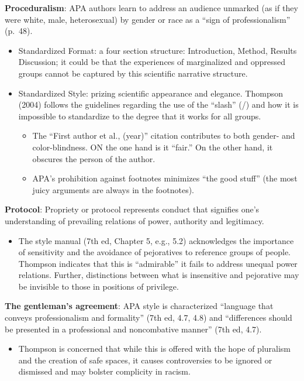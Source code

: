 \documentclass[
  english,
]{book}
\providecommand{\tightlist}{%
  \setlength{\itemsep}{0pt}\setlength{\parskip}{0pt}}
\begin{document}
\textbf{Proceduralism}: APA authors learn to address an audience unmarked (as if they were white, male, heterosexual) by gender or race as a ``sign of professionalism'' (p.~48).

\begin{itemize}
\tightlist
\item
  Standardized Format: a four section structure: Introduction, Method, Results Discussion; it could be that the experiences of marginalized and oppressed groups cannot be captured by this scientific narrative structure.
\item
  Standardized Style: prizing scientific appearance and elegance. Thompson (2004) follows the guidelines regarding the use of the ``slash'' (/) and how it is impossible to standardize to the degree that it works for all groups.

  \begin{itemize}
  \tightlist
  \item
    The ``First author et al., (year)'' citation contributes to both gender- and color-blindness. ON the one hand is it ``fair.'' On the other hand, it obscures the person of the author.
  \item
    APA's prohibition against footnotes minimizes ``the good stuff'' (the most juicy arguments are always in the footnotes).
  \end{itemize}
\end{itemize}

\textbf{Protocol}: Propriety or protocol represents conduct that signifies one's understanding of prevailing relations of power, authority and legitimacy.

\begin{itemize}
\tightlist
\item
  The style manual (7th ed, Chapter 5, e.g., 5.2) acknowledges the importance of sensitivity and the avoidance of pejoratives to reference groups of people. Thompson indicates that this is ``admirable'' it fails to address unequal power relations. Further, distinctions between what is insensitive and pejorative may be invisible to those in positions of privilege.
\end{itemize}

\textbf{The gentleman's agreement}: APA style is characterized ``language that conveys professionalism and formality'' (7th ed, 4.7, 4.8) and ``differences should be presented in a professional and noncombative manner'' (7th ed, 4.7).

\begin{itemize}
\tightlist
\item
  Thompson \citeyearpar{thompson_gentlemanly_2004} is concerned that while this is offered with the hope of pluralism and the creation of safe spaces, it causes controversies to be ignored or dismissed and may bolster complicity in racism.
\end{itemize}
\end{document}
